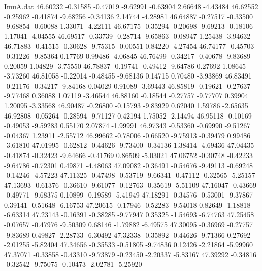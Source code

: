 \begin{filecontents}{ImuA.dat}
  46.60232   -0.31585   -0.47019   -9.62991   -0.63904    2.66648   -4.43484
  46.62552   -0.25962   -0.41874   -9.68256   -0.34136    2.14744   -4.28981
  46.64887   -0.27517   -0.33500   -9.68854   -0.60088    1.33071   -4.22111
  46.67175   -0.35294   -0.20698   -9.69213   -0.18106    1.17041   -4.04555
  46.69517   -0.33739   -0.28714   -9.65863   -0.08947    1.25438   -3.94632
  46.71883   -0.41515   -0.30628   -9.75315   -0.00551    0.84220   -4.27454
  46.74177   -0.45703   -0.31226   -9.85364    0.17769    0.99486   -4.06845
  46.76499   -0.34217   -0.40678   -9.83689    0.20059    1.04829   -3.75550
  46.78837   -0.19741   -0.49412   -9.64786    0.27692    1.08645   -3.73260
  46.81058   -0.22014   -0.48455   -9.68136    0.14715    0.70480   -3.93869
  46.83491   -0.21176   -0.34217   -9.84168    0.04029    0.91089   -3.69443
  46.85819   -0.19621   -0.27637   -9.77468    0.36088    1.07119   -3.46544
  46.88160   -0.18544   -0.27757   -9.77707    0.39904    1.20095   -3.33568
  46.90487   -0.26800   -0.15793   -9.83929    0.62040    1.59786   -2.65635
  46.92808   -0.05264   -0.28594   -9.71127    0.42194    1.75052   -2.14494
  46.95118   -0.10169   -0.49053   -9.59283    0.55170    2.07874   -1.99991
  46.97343   -0.53360   -0.69990   -9.51267   -0.04367    1.23911   -2.55712
  46.99662   -0.78006   -0.66520   -9.75913   -0.39479    0.99486   -3.61810
  47.01995   -0.62812   -0.44626   -9.73400   -0.34136    1.38414   -4.69436
  47.04435   -0.41874   -0.32423   -9.64666   -0.41769    0.86509   -5.03021
  47.06752   -0.30748   -0.42233   -9.64786   -0.72301    0.49871   -4.48063
  47.09082   -0.36491   -0.54676   -9.49113   -0.69248   -0.14246   -4.57223
  47.11325   -0.47498   -0.53719   -9.66341   -0.47112   -0.32565   -5.25157
  47.13693   -0.61376   -0.36610   -9.61077   -0.12763   -0.35619   -5.51109
  47.16047   -0.43669   -0.49771   -9.68375    0.10899   -0.19589   -5.41949
  47.18291   -0.34576   -0.53001   -9.37867    0.39141   -0.51648   -6.16753
  47.20615   -0.17946   -0.52283   -9.54018    0.82649   -1.18818   -6.63314
  47.23143   -0.16391   -0.38285   -9.77947    0.35325   -1.54693   -6.74763
  47.25458   -0.07657   -0.47976   -9.50309    0.68146   -1.79882   -6.49575
  47.30095   -0.36969   -0.27757   -9.83689    0.49827   -2.28733   -6.30492
  47.32338   -0.35892   -0.44626   -9.71366    0.27692   -2.01255   -5.82404
  47.34656   -0.35533   -0.51805   -9.74836    0.12426   -2.21864   -5.99960
  47.37071   -0.33858   -0.43310   -9.73879   -0.23450   -2.20337   -5.83167
  47.39292   -0.34816   -0.32542   -9.75075   -0.10473   -2.02781   -5.25920

\end{filecontents}
